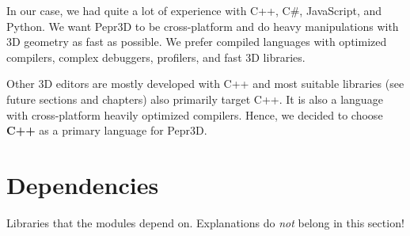 \medskip

In our case, we had quite a lot of experience with C++, C\#, JavaScript, and Python.
We want Pepr3D to be cross-platform and do heavy manipulations with 3D geometry as fast as possible.
We prefer compiled languages with optimized compilers, complex debuggers, profilers, and fast 3D libraries.

Other 3D editors are mostly developed with C++ and most suitable libraries (see future sections and chapters) also primarily target C++.
It is also a language with cross-platform heavily optimized compilers.
Hence, we decided to choose \textbf{C++} as a primary language for Pepr3D.

\section{Dependencies}

Libraries that the modules depend on.
Explanations do \emph{not} belong in this section!